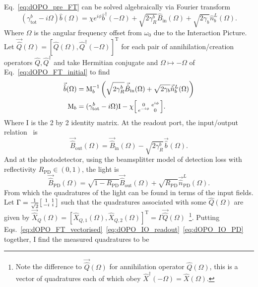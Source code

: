 Eq.~\ref{eq:dOPO_pre_FT} can be solved algebraically via Fourier transform %
\begin{equation}
\label{eq:dOPO_FT_initial}
(\gamma^b_\mathrm{tot}-i \Omega)\hat b(\Omega)=\chi e^{i\phi}\hat b^\dag(-\Omega)  + \sqrt{2\gamma^b_R}\hat{B}_\mathrm{in}(\Omega) + \sqrt{2\gamma_b}\hat{n}^L_b(\Omega).
\end{equation}
Where $\Omega$ is the angular frequency offset from $\omega_0$ due to the Interaction Picture. %
Let $\vec{\hat{Q}}(\Omega)=[\hat{Q}(\Omega),\hat{Q}^\dag(-\Omega)]^\text{T}$ for each pair of annihilation/creation operators $\hat Q, \hat Q^\dag$ and take Hermitian conjugate and $\Omega\mapsto -\Omega$ of Eq.~\ref{eq:dOPO_FT_initial} to find
\begin{align}
\label{eq:dOPO_FT_vectorised}
\vec{\hat b}(\Omega)&=\text{M}_b^{-1}\left(\sqrt{2\gamma^b_R}\vec{\hat{B}}_\mathrm{in}(\Omega) + \sqrt{2\gamma_b}\vec{\hat{n}}^L_b(\Omega)\right)\\
\text{M}_b&=(\gamma^b_\mathrm{tot}-i \Omega)\text{I}-\chi \begin{bsmallmatrix}0 & e^{i\phi} \\e^{-i\phi} & 0\end{bsmallmatrix}.
\end{align}
Where $\text{I}$ is the 2 by 2 identity matrix. At the readout port, the input/output relation~\cite{} is 
\begin{equation}
\label{eq:dOPO_IO_readout}\vec{\hat{B}}_\mathrm{out}(\Omega)=\vec{\hat{B}}_\mathrm{in}(\Omega)-\sqrt{2\gamma^b_R}\vec{\hat b}(\Omega).
\end{equation} 
And at the photodetector, using the beamsplitter model of detection loss with reflectivity $R_\text{PD}\in(0,1)$, the light is 
\begin{equation}
\label{eq:dOPO_IO_PD}\vec{\hat{B}}_\mathrm{PD}(\Omega)=\sqrt{1-R_\text{PD}}\vec{\hat{B}}_\mathrm{out}(\Omega)+\sqrt{R_\text{PD}}\vec{\hat n}^L_\text{PD}(\Omega).
\end{equation} 
From which the quadratures of the light can be found in terms of the input fields. Let $\Gamma = \frac{1}{\sqrt2} \begin{bsmallmatrix}1 & 1 \\-i & i\end{bsmallmatrix}$ such that the quadratures associated with some $\hat{Q}(\Omega)$ are given by $\vec{\hat{X}}_Q(\Omega)=[\hat{X}_{Q,1}(\Omega),\hat{X}_{Q,2}(\Omega)]^\text{T}=\Gamma \vec{\hat{Q}}(\Omega)$~\footnote{Note the difference to $\vec{\hat{Q}}(\Omega)$ for annihilation operator $\hat Q(\Omega)$, this is a vector of quadratures each of which obey $\hat{X}^\dag(-\Omega)=\hat{X}(\Omega)$.}. Putting Eqs.~\ref{eq:dOPO_FT_vectorised}~\ref{eq:dOPO_IO_readout}~\ref{eq:dOPO_IO_PD} together, I find the measured quadratures to be
